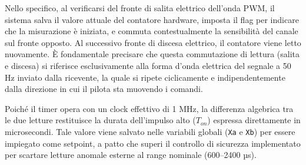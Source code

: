 \documentclass[11pt]{report}
\begin{document}
\noindent Nello specifico, al verificarsi del fronte di salita elettrico dell'onda PWM, il sistema salva il valore attuale del contatore hardware, imposta il flag per indicare che la misurazione è iniziata, e commuta contestualmente la sensibilità del canale sul fronte opposto. Al successivo fronte di discesa elettrico, il contatore viene letto nuovamente. È fondamentale precisare che questa commutazione di lettura (salita e discesa) si riferisce esclusivamente alla forma d'onda elettrica del segnale a 50 Hz inviato dalla ricevente, la quale si ripete ciclicamente e indipendentemente dalla direzione in cui il pilota sta muovendo i comandi.

\noindent Poiché il timer opera con un clock effettivo di 1 MHz, la differenza algebrica tra le due letture restituisce la durata dell'impulso alto ($T_{on}$) espressa direttamente in microsecondi. Tale valore viene salvato nelle variabili globali (\verb|Xa| e \verb|Xb|) per essere impiegato come setpoint, a patto che superi il controllo di sicurezza implementato per scartare letture anomale esterne al range nominale (600--2400 µs).
\end{document}
